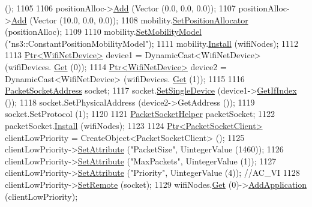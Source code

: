 \begin{DoxyCode}
      ();
1105 
1106   positionAlloc->\hyperlink{classns3_1_1ListPositionAllocator_a460e82f015ac012a73ba0ea0cccb3486}{Add} (Vector (0.0, 0.0, 0.0));
1107   positionAlloc->\hyperlink{classns3_1_1ListPositionAllocator_a460e82f015ac012a73ba0ea0cccb3486}{Add} (Vector (10.0, 0.0, 0.0));
1108   mobility.\hyperlink{classns3_1_1MobilityHelper_ac59d5295076be3cc11021566713a28c5}{SetPositionAllocator} (positionAlloc);
1109 
1110   mobility.\hyperlink{classns3_1_1MobilityHelper_a030275011b6f40682e70534d30280aba}{SetMobilityModel} (\textcolor{stringliteral}{"ns3::ConstantPositionMobilityModel"});
1111   mobility.\hyperlink{classns3_1_1MobilityHelper_a07737960ee95c0777109cf2994dd97ae}{Install} (wifiNodes);
1112 
1113   \hyperlink{classns3_1_1Ptr}{Ptr<WifiNetDevice>} device1 = DynamicCast<WifiNetDevice> (wifiDevices.
      \hyperlink{classns3_1_1NetDeviceContainer_a677d62594b5c9d2dea155cc5045f4d0b}{Get} (0));
1114   \hyperlink{classns3_1_1Ptr}{Ptr<WifiNetDevice>} device2 = DynamicCast<WifiNetDevice> (wifiDevices.
      \hyperlink{classns3_1_1NetDeviceContainer_a677d62594b5c9d2dea155cc5045f4d0b}{Get} (1));
1115 
1116   \hyperlink{classns3_1_1PacketSocketAddress}{PacketSocketAddress} socket;
1117   socket.\hyperlink{classns3_1_1PacketSocketAddress_ad1caa016f4d27c9d5f2c06dbfc53f8a3}{SetSingleDevice} (device1->\hyperlink{classns3_1_1WifiNetDevice_a6ab6ba34192411ac8203c4da52e5c6cc}{GetIfIndex} ());
1118   socket.SetPhysicalAddress (device2->GetAddress ());
1119   socket.SetProtocol (1);
1120 
1121   \hyperlink{classns3_1_1PacketSocketHelper}{PacketSocketHelper} packetSocket;
1122   packetSocket.\hyperlink{classns3_1_1PacketSocketHelper_a33f449fee7fd10411949d17feba6d33e}{Install} (wifiNodes);
1123 
1124   \hyperlink{classns3_1_1Ptr}{Ptr<PacketSocketClient>} clientLowPriority = CreateObject<PacketSocketClient> ();
1125   clientLowPriority->\hyperlink{classns3_1_1ObjectBase_ac60245d3ea4123bbc9b1d391f1f6592f}{SetAttribute} (\textcolor{stringliteral}{"PacketSize"}, UintegerValue (1460));
1126   clientLowPriority->\hyperlink{classns3_1_1ObjectBase_ac60245d3ea4123bbc9b1d391f1f6592f}{SetAttribute} (\textcolor{stringliteral}{"MaxPackets"}, UintegerValue (1));
1127   clientLowPriority->\hyperlink{classns3_1_1ObjectBase_ac60245d3ea4123bbc9b1d391f1f6592f}{SetAttribute} (\textcolor{stringliteral}{"Priority"}, UintegerValue (4)); \textcolor{comment}{//AC\_VI}
1128   clientLowPriority->\hyperlink{classns3_1_1PacketSocketClient_ae400727c451d429358b5c85838b901df}{SetRemote} (socket);
1129   wifiNodes.\hyperlink{classns3_1_1NodeContainer_a9ed96e2ecc22e0f5a3d4842eb9bf90bf}{Get} (0)->\hyperlink{classns3_1_1Node_ab98b4fdc4aadc86366b80e8a79a53f47}{AddApplication} (clientLowPriority);

\end{DoxyCode}

